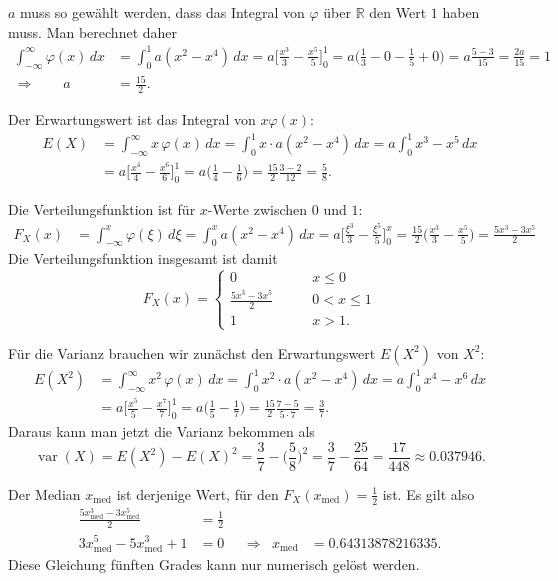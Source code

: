 \begin{loesung}
\begin{teilaufgaben}
\item
$a$ muss so gewählt werden, dass das Integral von $\varphi$ über
$\mathbb R$ den Wert $1$ haben muss.
Man berechnet daher
\begin{align*}
\int_{-\infty}^\infty \varphi(x)\,dx
&=
\int_0^1 a(x^2-x^4)\,dx
=
a \biggl[ \frac{x^3}3 - \frac{x^5}5 \biggr]_0^1
=
a\biggl(\frac13-0-\frac15+0\biggr)
=
a\frac{5-3}{15}
=
\frac{2a}{15}
=
1
\\
\Rightarrow\qquad
a
&=
\frac{15}{2}.
\end{align*}
\item
Der Erwartungswert ist das Integral von $x\varphi(x)$:
\begin{align*}
E(X)
&=
\int_{-\infty}^{\infty} x\, \varphi(x)\,dx
=
\int_0^1 x\cdot a(x^2-x^4)\,dx
=
a \int_0^1 x^3-x^5\,dx
\\
&=
a\biggl[\frac{x^4}{4}-\frac{x^6}6\biggr]_0^1
=
a\biggl( \frac{1}{4} - \frac{1}{6}\biggr)
=
\frac{15}{2} \frac{3-2}{12}
=
\frac{5}{8}.
\end{align*}
\item
Die Verteilungsfunktion ist für $x$-Werte zwischen $0$ und $1$:
\begin{align*}
F_X(x)
&=
\int_{-\infty}^x \varphi(\xi)\,d\xi
=
\int_0^x a(x^2-x^4)\,dx
=
a\biggl[\frac{\xi^3}{3} - \frac{\xi^5}{5}\biggr]_0^x
=
\frac{15}{2} \biggl(\frac{x^3}{3}-\frac{x^5}{5}\biggr)
=
\frac{5x^3-3x^5}{2}
\end{align*}
Die Verteilungsfunktion insgesamt ist damit
\[
F_X(x)
=
\begin{cases}
0&\qquad x\le 0\\
\displaystyle\frac{5x^3-3x^5}{2}&\qquad 0<x\le 1\\
1&\qquad x>1.
\end{cases}
\]
\item
Für die Varianz brauchen wir zunächst den Erwartungswert $E(X^2)$ von $X^2$:
\begin{align*}
E(X^2)
&=
\int_{-\infty}^\infty x^2\,\varphi(x)\,dx
=
\int_0^1 x^2\cdot a(x^2-x^4)\,dx
=
a\int_0^1 x^4-x^6\,dx
\\
&=
a\biggl[ \frac{x^5}{5}-\frac{x^7}{7}\biggr]_0^1
=
a\biggl(\frac{1}{5}-\frac{1}{7}\biggr)
=
\frac{15}{2}\frac{7-5}{5\cdot 7}
=
\frac{3}{7}.
\end{align*}
Daraus kann man jetzt die Varianz bekommen als
\[
\operatorname{var}(X)
=
E(X^2)-E(X)^2
=
\frac{3}{7} - \biggl(\frac{5}{8}\biggr)^2
=
\frac{3}{7}-\frac{25}{64}
=
\frac{17}{448}
\approx
0.037946.
\]
\item
Der Median $x_{\text{med}}$ ist derjenige Wert, für den
$F_X(x_{\text{med}}) = \frac12$ ist.
Es gilt also
\begin{align*}
\frac{5x_{\text{med}}^3-3x_{\text{med}}^5}{2} &= \frac12 \\
3x_{\text{med}}^5-5x_{\text{med}}^3+1&=0
&&\Rightarrow&
x_{\text{med}} &= 0.64313878216335.
\end{align*}
Diese Gleichung fünften Grades kann nur numerisch gelöst werden.
\qedhere
\end{teilaufgaben}
\end{loesung}

